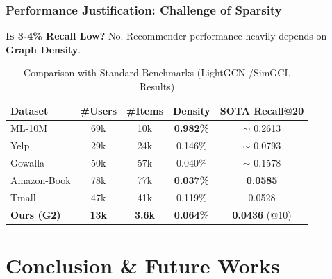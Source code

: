 \documentclass{beamer}
\begin{document}
\begin{frame}
    \frametitle{Performance Justification: Challenge of Sparsity}
    \textbf{Is 3-4\% Recall Low?} No. Recommender performance heavily depends on \textbf{Graph Density}.

    \vspace{0.2cm}

    \begin{table}
        \centering
        \small
        \begin{tabular}{l|c|c|c|c}
            \toprule
            \textbf{Dataset}   & \textbf{\#Users} & \textbf{\#Items} & \textbf{Density} & \textbf{SOTA Recall@20} \\
            \midrule
            ML-10M             & 69k              & 10k              & \textbf{0.982\%} & $\sim$ 0.2613           \\
            Yelp               & 29k              & 24k              & 0.146\%          & $\sim$ 0.0793           \\
            Gowalla            & 50k              & 57k              & 0.040\%          & $\sim$ 0.1578           \\
            Amazon-Book        & 78k              & 77k              & \textbf{0.037\%} & \textbf{0.0585}         \\
            Tmall              & 47k              & 41k              & 0.119\%          & 0.0528                  \\
            \midrule
            \textbf{Ours (G2)} & \textbf{13k}     & \textbf{3.6k}    & \textbf{0.064\%} & \textbf{0.0436} (@10)   \\
            \bottomrule
        \end{tabular}
        \caption{Comparison with Standard Benchmarks (LightGCN \cite{he2020lightgcn}/SimGCL \cite{yu2022graph} Results)}
    \end{table}

\end{frame}



\section{Conclusion \& Future Works}


\end{document}
